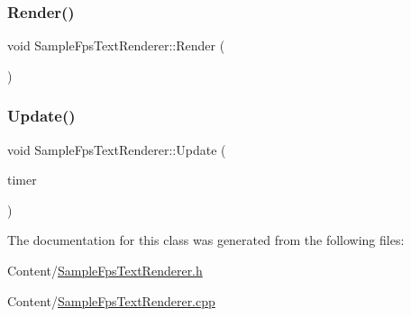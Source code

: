 \mbox{\label{class_cube_1_1_sample_fps_text_renderer_a2c86c474eda64ee8bed73c0590af12f3}} 
\subsubsection{\texorpdfstring{Render()}{Render()}}
{\footnotesize\ttfamily void Sample\+Fps\+Text\+Renderer\+::\+Render (\begin{DoxyParamCaption}{ }\end{DoxyParamCaption})}

\mbox{\label{class_cube_1_1_sample_fps_text_renderer_a8b854131222dcece3369c6b0d34ab16a}} 
\subsubsection{\texorpdfstring{Update()}{Update()}}
{\footnotesize\ttfamily void Sample\+Fps\+Text\+Renderer\+::\+Update (\begin{DoxyParamCaption}\item[{\hyperlink{class_d_x_1_1_step_timer}{D\+X\+::\+Step\+Timer} const \&}]{timer }\end{DoxyParamCaption})}



The documentation for this class was generated from the following files\+:\begin{DoxyCompactItemize}
\item 
Content/\hyperlink{_sample_fps_text_renderer_8h}{Sample\+Fps\+Text\+Renderer.\+h}\item 
Content/\hyperlink{_sample_fps_text_renderer_8cpp}{Sample\+Fps\+Text\+Renderer.\+cpp}\end{DoxyCompactItemize}
